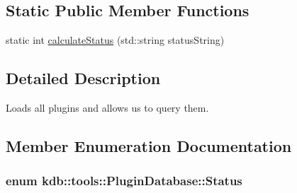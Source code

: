 \subsection*{Static Public Member Functions}
\begin{DoxyCompactItemize}
\item 
static int \hyperlink{classkdb_1_1tools_1_1PluginDatabase_ab901b98a6c7661bbccffa8ab9ff62dc6}{calculate\+Status} (std\+::string status\+String)
\end{DoxyCompactItemize}


\subsection{Detailed Description}
Loads all plugins and allows us to query them. 

\subsection{Member Enumeration Documentation}
\hypertarget{classkdb_1_1tools_1_1PluginDatabase_afc91ff760616ee83c6afb70e5a2f0601}{
\subsubsection[{Status}]{\setlength{\rightskip}{0pt plus 5cm}enum {\bf kdb\+::tools\+::\+Plugin\+Database\+::\+Status}}}\label{classkdb_1_1tools_1_1PluginDatabase_afc91ff760616ee83c6afb70e5a2f0601}
